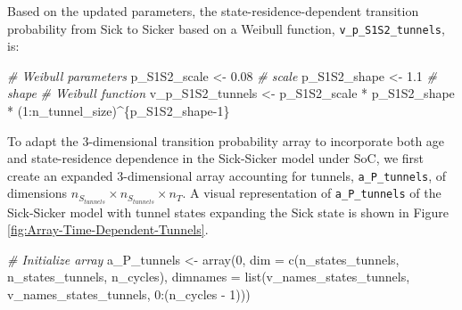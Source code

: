 \documentclass[
]{article}
\newenvironment{Shaded}{\begin{snugshade}}{\end{snugshade}}
\newcommand{\AttributeTok}[1]{\textcolor[rgb]{0.77,0.63,0.00}{#1}}
\newcommand{\CommentTok}[1]{\textcolor[rgb]{0.56,0.35,0.01}{\textit{#1}}}
\newcommand{\DecValTok}[1]{\textcolor[rgb]{0.00,0.00,0.81}{#1}}
\newcommand{\FloatTok}[1]{\textcolor[rgb]{0.00,0.00,0.81}{#1}}
\newcommand{\FunctionTok}[1]{\textcolor[rgb]{0.00,0.00,0.00}{#1}}
\newcommand{\NormalTok}[1]{#1}
\newcommand{\OtherTok}[1]{\textcolor[rgb]{0.56,0.35,0.01}{#1}}
\newcommand{\SpecialCharTok}[1]{\textcolor[rgb]{0.00,0.00,0.00}{#1}}
\begin{document}
Based on the updated parameters, the state-residence-dependent transition probability from Sick to Sicker based on a Weibull function, \texttt{v\_p\_S1S2\_tunnels}, is:

\begin{Shaded}
\begin{Highlighting}[]
\CommentTok{\# Weibull parameters}
\NormalTok{p\_S1S2\_scale }\OtherTok{\textless{}{-}} \FloatTok{0.08} \CommentTok{\# scale}
\NormalTok{p\_S1S2\_shape  }\OtherTok{\textless{}{-}} \FloatTok{1.1}  \CommentTok{\# shape}
\CommentTok{\# Weibull function}
\NormalTok{v\_p\_S1S2\_tunnels }\OtherTok{\textless{}{-}}\NormalTok{ p\_S1S2\_scale }\SpecialCharTok{*}\NormalTok{ p\_S1S2\_shape }\SpecialCharTok{*}
\NormalTok{  (}\DecValTok{1}\SpecialCharTok{:}\NormalTok{n\_tunnel\_size)}\SpecialCharTok{\^{}}\NormalTok{\{p\_S1S2\_shape}\DecValTok{{-}1}\NormalTok{\}}
\end{Highlighting}
\end{Shaded}

To adapt the 3-dimensional transition probability array to incorporate both age and state-residence dependence in the Sick-Sicker model under SoC, we first create an expanded 3-dimensional array accounting for tunnels, \texttt{a\_P\_tunnels}, of dimensions \(n_{S_{tunnels}} \times n_{S_{tunnels}} \times n_T\). A visual representation of \texttt{a\_P\_tunnels} of the Sick-Sicker model with tunnel states expanding the Sick state is shown in Figure \ref{fig:Array-Time-Dependent-Tunnels}.

\begin{Shaded}
\begin{Highlighting}[]
\CommentTok{\# Initialize array}
\NormalTok{a\_P\_tunnels }\OtherTok{\textless{}{-}} \FunctionTok{array}\NormalTok{(}\DecValTok{0}\NormalTok{, }\AttributeTok{dim =} \FunctionTok{c}\NormalTok{(n\_states\_tunnels, n\_states\_tunnels, n\_cycles),}
                     \AttributeTok{dimnames =} \FunctionTok{list}\NormalTok{(v\_names\_states\_tunnels, }
\NormalTok{                                     v\_names\_states\_tunnels, }
                                     \DecValTok{0}\SpecialCharTok{:}\NormalTok{(n\_cycles }\SpecialCharTok{{-}} \DecValTok{1}\NormalTok{)))}
\end{Highlighting}
\end{Shaded}
\end{document}
